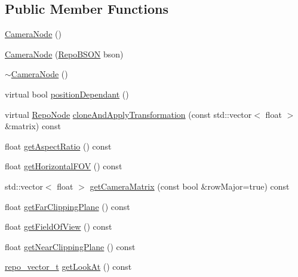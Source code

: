 \subsection*{Public Member Functions}
\begin{DoxyCompactItemize}
\item 
\hyperlink{classrepo_1_1core_1_1model_1_1_camera_node_a6e93f1af26050fe9ec35645785e29824}{Camera\+Node} ()
\item 
\hyperlink{classrepo_1_1core_1_1model_1_1_camera_node_a78aa6c32e17a3688e8490b69d7bb471a}{Camera\+Node} (\hyperlink{classrepo_1_1core_1_1model_1_1_repo_b_s_o_n}{Repo\+B\+S\+O\+N} bson)
\item 
\hyperlink{classrepo_1_1core_1_1model_1_1_camera_node_ab3a466dc9357b5200fb6843a6d64c5c8}{$\sim$\+Camera\+Node} ()
\item 
virtual bool \hyperlink{classrepo_1_1core_1_1model_1_1_camera_node_a5ff50e052f4266842e5d4e4840fe0c37}{position\+Dependant} ()
\item 
virtual \hyperlink{classrepo_1_1core_1_1model_1_1_repo_node}{Repo\+Node} \hyperlink{classrepo_1_1core_1_1model_1_1_camera_node_a98b1b2260da36fb75ff894c98df901cf}{clone\+And\+Apply\+Transformation} (const std\+::vector$<$ float $>$ \&matrix) const 
\item 
float \hyperlink{classrepo_1_1core_1_1model_1_1_camera_node_a49b27f160ea40eeb77e11c88e3a913d9}{get\+Aspect\+Ratio} () const 
\item 
float \hyperlink{classrepo_1_1core_1_1model_1_1_camera_node_a82d9fd39b1140e2d7e1ad3b6a4c1b753}{get\+Horizontal\+F\+O\+V} () const 
\item 
std\+::vector$<$ float $>$ \hyperlink{classrepo_1_1core_1_1model_1_1_camera_node_a7907960b05c955e3b56772bd09d9a919}{get\+Camera\+Matrix} (const bool \&row\+Major=true) const 
\item 
float \hyperlink{classrepo_1_1core_1_1model_1_1_camera_node_a321ee8fdfacf5705788b02c36b7cd391}{get\+Far\+Clipping\+Plane} () const 
\item 
float \hyperlink{classrepo_1_1core_1_1model_1_1_camera_node_aba3a69203e5c273a81d56a628498e21f}{get\+Field\+Of\+View} () const 
\item 
float \hyperlink{classrepo_1_1core_1_1model_1_1_camera_node_a7aae7ebc82db8fb039ab153bdd547cba}{get\+Near\+Clipping\+Plane} () const 
\item 
\hyperlink{structrepo__vector__t}{repo\+\_\+vector\+\_\+t} \hyperlink{classrepo_1_1core_1_1model_1_1_camera_node_a8cc4988da42d2eeaff46ed88c2291422}{get\+Look\+At} () const 

\end{DoxyCompactItemize}
